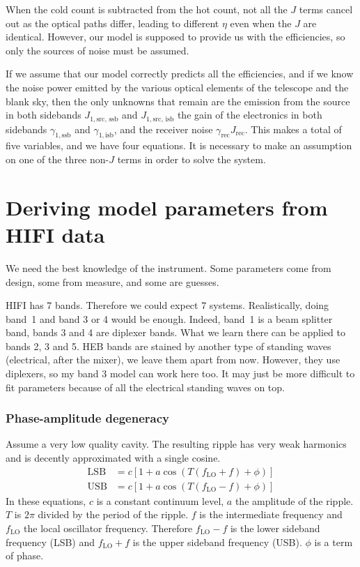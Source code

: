 When the cold count is subtracted from the hot count, not all the $J$ terms cancel out as the optical paths differ, leading to different $\eta$ even when the $J$ are identical.
However, our model is supposed to provide us with the efficiencies, so only the sources of noise must be assumed.

If we assume that our model correctly predicts all the efficiencies, and if we know the noise power emitted by the various optical elements of the telescope and the blank sky, then the only unknowns that remain are the emission from the source in both sidebands
$J_{1,\text{src, ssb}}$ and $J_{1,\text{src, isb}}$
the gain of the electronics in both sidebands
$\gamma_{1,\text{ssb}}$ and $\gamma_{1,\text{isb}}$,
and the receiver noise $\gamma_\text{rec} J_\text{rec}$.
This makes a total of five variables, and we have four equations.
It is necessary to make an assumption on one of the three non-$J$ terms in order to solve the system.



\section{Deriving model parameters from HIFI data}
We need the best knowledge of the instrument.
Some parameters come from design, some from measure, and some are guesses.

HIFI has 7 bands.  Therefore we could expect 7 systems.
Realistically, doing band~1 and band 3 or 4 would be enough.
Indeed, band~1 is a beam splitter band, bands 3 and 4 are diplexer bands.
What we learn there can be applied to bands 2, 3 and 5.
HEB bands are stained by another type of standing waves (electrical, after the mixer), we leave them apart from now.
However, they use diplexers, so my band 3 model can work here too.  It may just be more difficult to fit parameters because of all the electrical standing waves on top.

\subsubsection{Phase-amplitude degeneracy}

Assume a very low quality cavity.
The resulting ripple has very weak harmonics and is decently approximated with a single cosine.
\begin{align}
    \text{LSB} &= c \left[ 1 + a \cos(T(f_\text{LO} + f) + \phi) \right]
    \\
    \text{USB} &= c \left[ 1 + a \cos(T(f_\text{LO} - f) + \phi) \right]
\end{align}
In these equations, $c$ is a constant continuum level, $a$ the amplitude of the ripple.
$T$ is $2\pi$ divided by the period of the ripple.
$f$ is the intermediate frequency and $f_\text{LO}$ the local oscillator frequency.
Therefore $f_\text{LO} - f$ is the lower sideband frequency (LSB) and $f_\text{LO} + f$ is the upper sideband frequency (USB).
$\phi$ is a term of phase.

